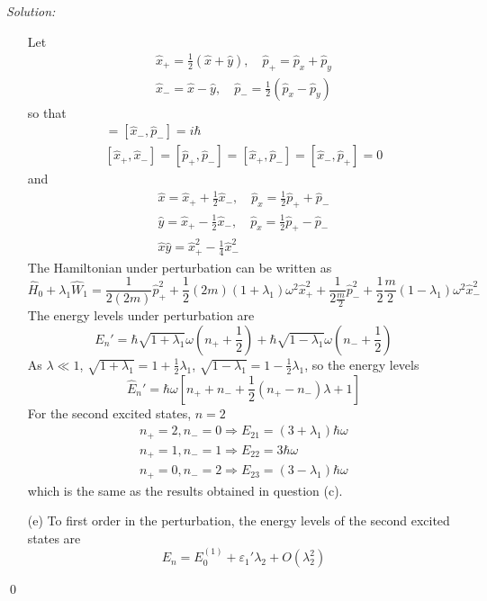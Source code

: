 \documentclass[10pt,a4paper]{article}
\newenvironment{sol}
    {\emph{Solution:}
    }
    {
    \qed
    }
\begin{document}
\begin{sol}
\begin{itemize}
Let
\begin{gather}
\hat{x}_+=\frac{1}{2}(\hat{x}+\hat{y}),\quad\hat{p}_+=\hat{p}_x+\hat{p}_y\\
\hat{x}_-=\hat{x}-\hat{y},\quad\hat{p}_-=\frac{1}{2}(\hat{p}_x-\hat{p}_y)
\end{gather}
so that
\begin{gather}
[\hat{x}_+,\hat{p}_+]=[\hat{x}_-,\hat{p}_-]=i\hbar\\
[\hat{x}_+,\hat{x}_-]=[\hat{p}_+,\hat{p}_-]=[\hat{x}_+,\hat{p}_-]=[\hat{x}_-,\hat{p}_+]=0
\end{gather}
and
\begin{gather}
\hat{x}=\hat{x}_++\frac{1}{2}\hat{x}_-,\quad\hat{p}_x=\frac{1}{2}\hat{p}_++\hat{p}_-\\
\hat{y}=\hat{x}_+-\frac{1}{2}\hat{x}_-,\quad\hat{p}_x=\frac{1}{2}\hat{p}_+-\hat{p}_-\\
\hat{x}\hat{y}=\hat{x}_+^2-\frac{1}{4}\hat{x}_-^2
\end{gather}
The Hamiltonian under perturbation can be written as
\begin{equation}
\hat{H}_0+\lambda_1\hat{W}_1=\frac{1}{2(2m)}\hat{p}_+^2+\frac{1}{2}(2m)(1+\lambda_1)\omega^2\hat{x}_+^2+\frac{1}{2\frac{m}{2}}\hat{p}_-^2+\frac{1}{2}\frac{m}{2}(1-\lambda_1)\omega^2\hat{x}_-^2
\end{equation}
The energy levels under perturbation are
\begin{equation}
E_n'=\hbar\sqrt{1+\lambda_1}\omega(n_++\frac{1}{2})+\hbar\sqrt{1-\lambda_1}\omega(n_-+\frac{1}{2})
\end{equation}
As $\lambda\ll1$, $\sqrt{1+\lambda_1}=1+\frac{1}{2}\lambda_1$, $\sqrt{1-\lambda_1}=1-\frac{1}{2}\lambda_1$, so the energy levels
\begin{equation}
\hat{E}_n'=\hbar\omega[n_++n_-+\frac{1}{2}(n_+-n_-)\lambda+1]
\end{equation}
For the second excited states, $n=2$
\begin{gather}
n_+=2,n_-=0\Longrightarrow E_{21}=(3+\lambda_1)\hbar\omega\\
n_+=1,n_-=1\Longrightarrow E_{22}=3\hbar\omega\\
n_+=0,n_-=2\Longrightarrow E_{23}=(3-\lambda_1)\hbar\omega
\end{gather}
which is the same as the results obtained in question (c).
\item[(e)] To first order in the perturbation, the energy levels of the second excited states are
\begin{equation}
E_n=E_0^{(1)}+\varepsilon_1'\lambda_2+O(\lambda_2^{2})

\end{equation}
\end{itemize}
\end{sol}
\end{document}
